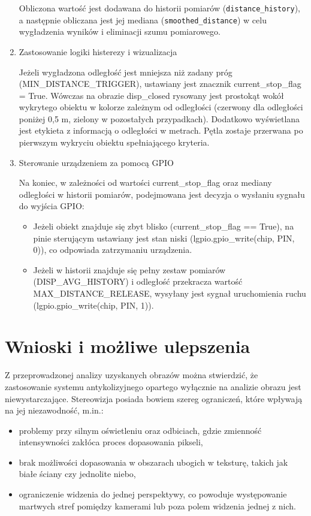 \documentclass[magisterska]{pracadypl}
\begin{document}
\begin{enumerate}
Obliczona wartość jest dodawana do historii pomiarów (\texttt{distance\_history}), a następnie obliczana jest jej mediana (\texttt{smoothed\_distance}) w celu wygładzenia wyników i eliminacji szumu pomiarowego.

\item Zastosowanie logiki histerezy i wizualizacja

Jeżeli wygładzona odległość jest mniejsza niż zadany próg (MIN\_DISTANCE\_TRIGGER), ustawiany jest znacznik current\_stop\_flag = True. Wówczas na obrazie disp\_closed rysowany jest prostokąt wokół wykrytego obiektu w kolorze zależnym od odległości (czerwony dla odległości poniżej 0,5 m, zielony w pozostałych przypadkach). Dodatkowo wyświetlana jest etykieta z informacją o odległości w metrach. Pętla zostaje przerwana po pierwszym wykryciu obiektu spełniającego kryteria.

\item Sterowanie urządzeniem za pomocą GPIO

Na koniec, w zależności od wartości current\_stop\_flag oraz mediany odległości w historii pomiarów, podejmowana jest decyzja o wysłaniu sygnału do wyjścia GPIO:
  \begin{itemize}
    \item Jeżeli obiekt znajduje się zbyt blisko (current\_stop\_flag == True), na pinie sterującym ustawiany jest stan niski (lgpio.gpio\_write(chip, PIN, 0)), co odpowiada zatrzymaniu urządzenia.
    \item Jeżeli w historii znajduje się pełny zestaw pomiarów (DISP\_AVG\_HISTORY) i odległość przekracza wartość MAX\_DISTANCE\_RELEASE, wysyłany jest sygnał uruchomienia ruchu (lgpio.gpio\_write(chip, PIN, 1)).
  \end{itemize}

\end{enumerate}

\chapter{Wnioski i możliwe ulepszenia}

Z przeprowadzonej analizy uzyskanych obrazów można stwierdzić, że zastosowanie systemu antykolizyjnego opartego wyłącznie na analizie obrazu jest niewystarczające. 
Stereowizja posiada bowiem szereg ograniczeń, które wpływają na jej niezawodność, m.in.: 

\begin{itemize}
    \item problemy przy silnym oświetleniu oraz odbiciach, gdzie zmienność intensywności zakłóca proces dopasowania pikseli,
    \item brak możliwości dopasowania w obszarach ubogich w teksturę, takich jak białe ściany czy jednolite niebo,
    \item ograniczenie widzenia do jednej perspektywy, co powoduje występowanie martwych stref pomiędzy kamerami lub poza polem widzenia jednej z nich.
\end{itemize}
\end{document}
